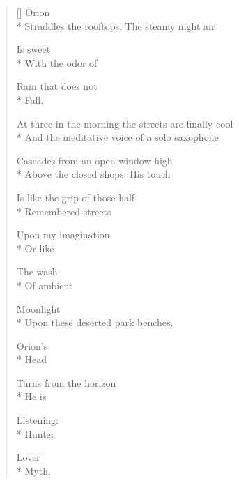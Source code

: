 \label{ch:poem_for_the_mythic_lover}
\settowidth{\versewidth}{Above the closed shops.\qquad\qquad His touch}
\begin{verse}[\versewidth]
\hspace*{3\vgap} Orion\\*
Straddles the rooftops.   The steamy night air

Is sweet\\*
With the odor of

Rain that does not\\*
Fall.

At three in the morning the streets are finally cool\\*
And the meditative voice of a solo saxophone

Cascades from an open window high\\*
Above the closed shops. \hspace*{2\vgap} His touch

Is like the grip of those half-\\*
Remembered streets

Upon my imagination\\*
Or like

The wash\\*
Of ambient

Moonlight\\*
Upon these deserted park benches.

Orion's\\*
Head

Turns from the horizon\\*
He is

Listening:\\*
Hunter

Lover\\*
Myth.
\end{verse}
